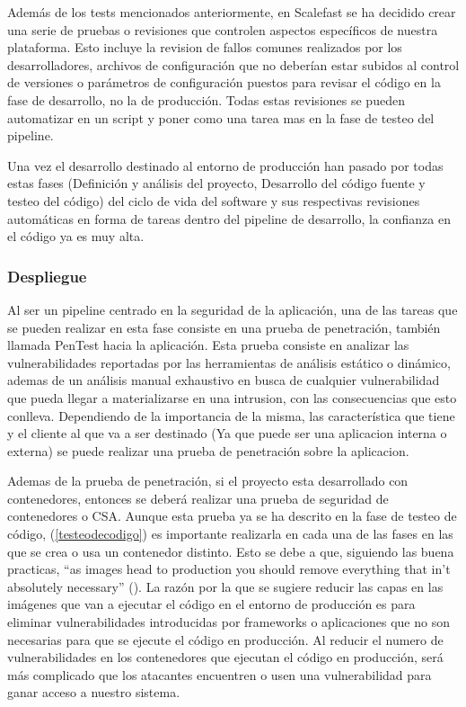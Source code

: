 \documentclass[12pt]{report} %
\begin{document}
Además de los tests mencionados anteriormente, en Scalefast se ha decidido crear
una serie de pruebas o revisiones que controlen aspectos específicos de nuestra
plataforma.
Esto incluye la revision de fallos comunes realizados por los desarrolladores,
archivos de configuración que no deberían estar subidos al control de versiones
o parámetros de configuración puestos para revisar el código en la fase de
desarrollo, no la de producción.
Todas estas revisiones se pueden automatizar en un script y poner como una tarea
mas en la fase de testeo del \gls{pipeline}. 

Una vez el desarrollo destinado al entorno de producción han pasado por
todas estas fases (Definición y análisis del proyecto, Desarrollo del código
fuente y testeo del código) del ciclo de vida del software y sus respectivas
revisiones automáticas en forma de tareas dentro del \gls{pipeline} de
desarrollo, la confianza en el código ya es muy alta.

\subsubsection{Despliegue} 

Al ser un \gls{pipeline} centrado en la seguridad de la aplicación, una de las tareas
que se pueden realizar en esta fase consiste en una prueba de penetración,
también llamada \gls{PenTest} hacia la aplicación.
Esta prueba consiste en analizar las vulnerabilidades reportadas por las
herramientas de análisis estático o dinámico, ademas de un análisis manual
exhaustivo en busca de cualquier vulnerabilidad que pueda llegar a
materializarse en una intrusion, con las consecuencias que esto conlleva.  
Dependiendo de la importancia de la misma, las característica que tiene y el
cliente al que va a ser destinado (Ya que puede ser una aplicacion interna o
externa) se puede realizar una prueba de penetración sobre la aplicacion.

Ademas de la prueba de penetración, si el proyecto esta desarrollado con
contenedores, entonces se deberá realizar una prueba de seguridad de
contenedores o \gls{CSA}.
Aunque esta prueba ya se ha descrito en la fase de testeo de código,
(\ref{testeodecodigo}) es importante realizarla en cada una de las fases en las
que se crea o usa un contenedor distinto.
Esto se debe a que, siguiendo las buena practicas, ``as images head
to production you should remove everything that in’t absolutely necessary''
(\cite{Armstrong2020}).
La razón por la que se sugiere reducir las capas en las imágenes que van a
ejecutar el código en el entorno de producción es para eliminar vulnerabilidades
introducidas por frameworks o aplicaciones que no son necesarias para que se
ejecute el código en producción.
Al reducir el numero de vulnerabilidades en los contenedores que ejecutan el
código en producción, será más complicado que los atacantes encuentren o usen
una vulnerabilidad para ganar acceso a nuestro sistema.
\end{document}
